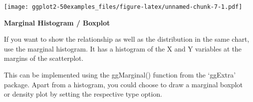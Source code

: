 \documentclass[a4paper]{article}
\newenvironment{Shaded}{\begin{snugshade}}{\end{snugshade}}
\newcommand{\KeywordTok}[1]{\textcolor[rgb]{0.13,0.29,0.53}{\textbf{#1}}}
\newcommand{\DataTypeTok}[1]{\textcolor[rgb]{0.13,0.29,0.53}{#1}}
\newcommand{\StringTok}[1]{\textcolor[rgb]{0.31,0.60,0.02}{#1}}
\newcommand{\CommentTok}[1]{\textcolor[rgb]{0.56,0.35,0.01}{\textit{#1}}}
\newcommand{\OperatorTok}[1]{\textcolor[rgb]{0.81,0.36,0.00}{\textbf{#1}}}
\newcommand{\NormalTok}[1]{#1}
\begin{document}
\begin{Shaded}
\end{Shaded}

\texttt{[image: ggplot2-50examples\_files/figure-latex/unnamed-chunk-7-1.pdf]}
\newpage

\newpage

\textbf{Marginal Histogram / Boxplot}

If you want to show the relationship as well as the distribution in the
same chart, use the marginal histogram. It has a histogram of the X and
Y variables at the margins of the scatterplot.

This can be implemented using the ggMarginal() function from the
`ggExtra' package. Apart from a histogram, you could choose to draw a
marginal boxplot or density plot by setting the respective type option.
\end{document}
